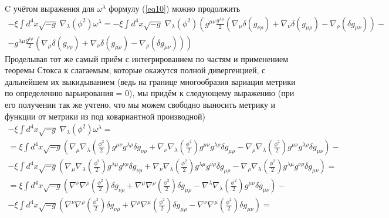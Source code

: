 \documentclass[12pt]{article}
\theoremstyle{definition}
\begin{document}
\begin{enumerate}
C учётом выражения для $\omega^\lambda$ формулу (\ref{eq10}) можно продолжить
\begin{multline}
    -\xi \int d^4x \sqrt{-g}\;\nabla_\lambda\left(\phi^2\right)\omega^\lambda=-\xi \int d^4x \sqrt{-g}\;\nabla_\lambda\left(\phi^2\right)\left(g^{\mu\nu}\frac{g^{\lambda\rho}}{2}\left(\nabla_{\mu}\delta \left(g_{\nu\rho}\right)+ \nabla_{\nu}\delta \left(g_{\mu\rho}\right)-\nabla_\rho\left(\delta g_{\mu\nu}\right)\right)-\right.\\\left.
   -g^{\lambda\mu}\frac{g^{\nu\rho}}{2}\left(\nabla_{\mu}\delta \left(g_{\nu\rho}\right)+ \nabla_{\nu}\delta \left(g_{\mu\rho}\right)- \nabla_\rho\left(\delta g_{\mu\nu}\right)\right)\right)
\end{multline}
Проделывая тот же самый приём с интегрированием по частям и применением теоремы Стокса к слагаемым, которые окажутся полной дивергенцией, с дальнейшем их выкидыванием (ведь на границе многообразия вариация метрики по определению варьирования = 0), мы придём к следующему выражению (при его получении так же учтено, что мы можем свободно выносить метрику и функции от метрики из под ковариантной производной)
\begin{multline}
     -\xi \int d^4x \sqrt{-g}\;\nabla_\lambda\left(\phi^2\right)\omega^\lambda= \\
     =\xi \int d^4x \sqrt{-g}\left(\nabla_{\mu}\nabla_{\lambda}\left(\frac{\phi^2}{2}\right)g^{\mu\nu}g^{\lambda\rho}\delta g_{\nu\rho}+\nabla_{\nu}\nabla_{\lambda}\left(\frac{\phi^2}{2}\right)g^{\mu\nu}g^{\lambda\rho}\delta g_{\mu\rho}-\nabla_{\rho}\nabla_{\lambda}\left(\frac{\phi^2}{2}\right)g^{\mu\nu}g^{\lambda\rho}\delta g_{\mu\nu}\right)-\\
     -\xi \int d^4x \sqrt{-g}\left(\nabla_{\mu}\nabla_{\lambda}\left(\frac{\phi^2}{2}\right)g^{\lambda\mu}g^{\nu\rho}\delta g_{\nu\rho}+\nabla_{\nu}\nabla_{\lambda}\left(\frac{\phi^2}{2}\right)g^{\lambda\mu}g^{\nu\rho}\delta g_{\mu\rho}-\nabla_{\rho}\nabla_{\lambda}\left(\frac{\phi^2}{2}\right)g^{\lambda\mu}g^{\nu\rho}\delta g_{\mu\nu}\right)=\\
     =\xi \int d^4x \sqrt{-g}\left(\nabla^{\nu}\nabla^{\rho}\left(\frac{\phi^2}{2}\right)\delta g_{\nu\rho}+\nabla^{\mu}\nabla^{\rho}\left(\frac{\phi^2}{2}\right)\delta g_{\mu\rho}-\nabla^{\lambda}\nabla_{\lambda}\left(\frac{\phi^2}{2}\right)g^{\mu\nu}\delta g_{\mu\nu}\right)-\\
     -\xi \int d^4x \sqrt{-g}\left(\nabla^{\nu}\nabla^{\rho}\left(\frac{\phi^2}{2}\right)\delta g_{\nu\rho}+\nabla^{\rho}\nabla^{\mu}\left(\frac{\phi^2}{2}\right)\delta g_{\mu\rho}-\nabla^{\nu}\nabla^{\mu}\left(\frac{\phi^2}{2}\right)\delta g_{\mu\nu}\right)=\\

\end{multline}
\end{enumerate}
\end{document}
